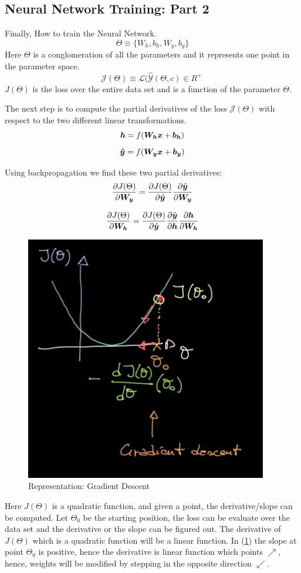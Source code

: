 \subsection{Neural Network Training: Part 2}
Finally, How to train the Neural Network. 
\[\Theta \equiv \{ W_h, b_h , W_y, b_y \} \]
Here $\Theta$ is  a conglomeration of all the parameters and it represents one point in the parameter space.  
\[
   \mathcal{J}(\Theta) \equiv \mathcal{L}(\hat{\mathcal{Y}}(\Theta,c) \in R^+\
\]
$J(\Theta)$ is the loss over the entire data set and is a function of the parameter $\Theta$.

The next step is to compute the partial derivatives of the loss $\mathcal{J}(\Theta)$ with respect to the two different linear transformations. 
\[\matr{h} = f(\matr{W_h} \matr{x} + \vect{b_h})\]
\[\matr{\hat{y}} = f(\matr{W_y} \matr{x} + \vect{b_y})\]

Using backpropagation we find these two partial derivatives:
\[
    \frac{\partial J(\Theta)}{\partial \matr{W_y}} = 
    \frac{\partial J(\Theta)}{\partial \hat{\vect{y}}}
    \frac{\partial \hat{\vect{y}}}{\partial \matr{W_y}}
\]
    
\[
\frac{\partial J(\Theta)}{\partial \matr{W_h}} =
\frac{\partial J(\Theta)}{\partial \hat{\vect{y}}}
\frac{\partial \hat{\vect{y}}}{\partial \matr{h}}
\frac{\partial \matr{h}}{\partial \matr{W_h}}
\]


\begin{figure}[ht]
    \centering
    \includegraphics[width=300pt]{figs/gradient_descent.jpg}
    \caption{Representation: Gradient Descent}
    \label{fig:gradient_descent}
\end{figure}

Here $J(\Theta)$ is a  quadratic function, and given a point, the derivative/slope can be computed.
Let $\Theta_0$ be the starting position, the loss can be evaluate over the data set and the derivative or the slope can be figured out.
The derivative of $J(\Theta)$ which is a quadratic function will be a linear function.
In (\cref{fig:gradient_descent}) the slope at point $\Theta_0$ is positive, hence the derivative is linear function which points $\nearrow$, hence, weights will be modified by stepping in the opposite direction $\swarrow$.